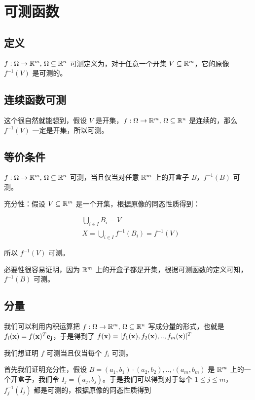 \renewcommand{\f}{f: \Omega \to \R^m,\, \Omega \subseteq \R^n }
\section{可测函数}

\subsection{定义}

$\f$ 可测定义为，对于任意一个开集 $V \subseteq \mathbb{R}^m$，它的原像 $f^{-1}(V)$ 是可测的。

\subsection{连续函数可测}

这个很自然就能想到，假设 $V$ 是开集，$\f$ 是连续的，那么 $f^{-1}(V)$ 一定是开集，所以可测。

\subsection{等价条件}

$\f$ 可测，当且仅当对任意 $\mathbb{R}^m$ 上的开盒子 $B$，$f^{-1}(B)$ 可测。

充分性：假设 $V \subseteq \mathbb{R}^m$ 是一个开集，根据原像的同态性质得到：

\begin{align*}
& \bigcup_{i \in I}B_i = V \\
& X = \bigcup_{i \in I}f^{-1}(B_i) = f^{-1}(V)
\end{align*}

所以 $f^{-1}(V)$ 可测。 

必要性很容易证明，因为 $\mathbb{R}^m$  上的开盒子都是开集，根据可测函数的定义可知， $f^{-1}(B)$ 可测。


\subsection{分量}

我们可以利用内积运算把 $\f$ 写成分量的形式，也就是 $f_i(\mathbf{x}) = f(\mathbf{x})^T \mathbf{e_j}$，于是得到了 
$f(\mathbf{x}) = [f_1(\mathbf{x}), f_2(\mathbf{x}), .., f_m(\mathbf{x})]^T $

我们想证明 $f$ 可测当且仅当每个 $f_i$ 可测。

首先我们证明充分性，假设 $B=(a_1,b_1) \cdot (a_2, b_2),.., \cdot(a_m,b_m)$ 是 $\mathbb{R}^m$ 上的一个开盒子，我们令 $I_j = (a_j, b_j)$。于是我们可以得到对于每个 $1 \le j \le m$，
$f_j^{-1}(I_j)$ 都是可测的，根据原像的同态性质得到


